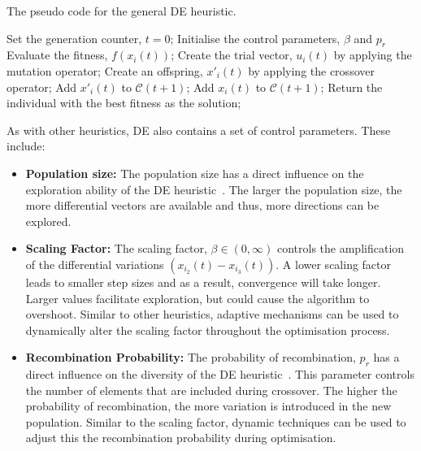 \begin{algorithm}[H]
      \caption{The pseudo code for the general \acs{DE} heuristic.}
      \label{algo:heuristics:de:general_de}
      \begin{algorithmic}
            \State Set the generation counter, $t = 0$;
            \State Initialise the control parameters, $\beta$ and $p_{r}$
            \State Evaluate the fitness, $f(x_{i}(t))$;
            \State Create the trial vector, $u_{i}(t)$ by applying the mutation operator;
            \State Create an offspring, $x'_{i}(t)$ by applying the crossover operator;
            \State Add $x'_{i}(t)$ to $\mathcal{C}(t+1)$;
            \Else
            \State Add $x_{i}(t)$ to $\mathcal{C}(t+1)$;
            \EndIf
            \EndFor
            \EndWhile
            \State Return the individual with the best fitness as the solution;
      \end{algorithmic}
\end{algorithm}

\noindent
As with other heuristics, \acs{DE} also contains a set of control parameters. These include:

\begin{itemize}
      \item \textbf{Population size:} The population size has a direct influence on the exploration ability of the \acs{DE} heuristic~\cite{ref:engelbrecht:2007}. The larger the population size, the more differential vectors are available and thus, more directions can be explored.

      \item \textbf{Scaling Factor:} The scaling factor, $\beta \in (0, \infty)$ controls the amplification of the differential variations $(x_{i_{2}}(t) - x_{i_{3}}(t))$. A lower scaling factor leads to smaller step sizes and as a result, convergence will take longer. Larger values facilitate exploration, but could cause the algorithm to overshoot. Similar to other heuristics, adaptive mechanisms can be used to dynamically alter the scaling factor throughout the optimisation process.

      \item \textbf{Recombination Probability:} The probability of recombination, $p_{r}$ has a direct influence on the diversity of the \acs{DE} heuristic~\cite{ref:engelbrecht:2007}. This parameter controls the number of elements that are included during crossover. The higher the probability of recombination, the more variation is introduced in the new population. Similar to the scaling factor, dynamic techniques can be used to adjust this the recombination probability during optimisation.
\end{itemize}

